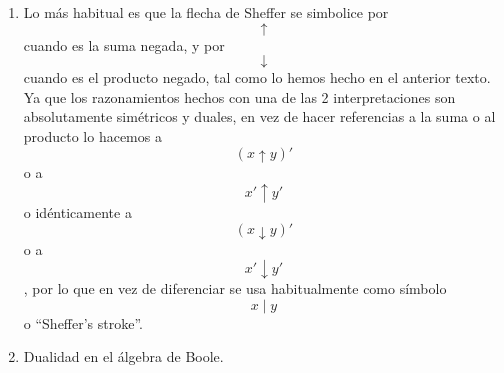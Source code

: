 \documentclass[
]{article}
\providecommand{\tightlist}{%
  \setlength{\itemsep}{0pt}\setlength{\parskip}{0pt}}
\begin{document}
\begin{enumerate}
\begin{enumerate}
\begin{enumerate}
\begin{enumerate}
\begin{enumerate}
          \begin{enumerate}
          \def\labelenumvi{\arabic{enumvi}.}
          \item
            \[\forall x\exists y{{x \cdot y} = 0}\]

            \begin{enumerate}
            \def\labelenumvii{\arabic{enumvii}.}
            \tightlist
            \item
              \[y{: = x}@{x = x}'\]
            \item
              \[{x \cdot x}{' = {({x@x'})}}{' = 1}{' = 0}\]
            \end{enumerate}
          \item
            \[\forall x\exists y{{x + y} = 1}\]

            \begin{enumerate}
            \def\labelenumvii{\arabic{enumvii}.}
            \tightlist
            \item
              \[y{: = x}@{x = x}'\]
            \item
              \[{x + x}{{{' = {x'@x}} = {x@x'}} = 1}\]
            \end{enumerate}
          \end{enumerate}
        \item
          Definición: \[\overline{x} ≝ {x@x}{\equiv}x'\]
        \end{enumerate}
      \end{enumerate}
    \item
      Lo más habitual es que la flecha de Sheffer se simbolice por
      \[\uparrow\] cuando es la suma negada, y por \[\downarrow\]cuando
      es el producto negado, tal como lo hemos hecho en el anterior
      texto. Ya que los razonamientos hechos con una de las 2
      interpretaciones son absolutamente simétricos y duales, en vez de
      hacer referencias a la suma o al producto lo hacemos a
      \[{({x \uparrow y})}'\]o a \[x' \uparrow y'\]o idénticamente a
      \[{({x \downarrow y})}'\]o a \[x' \downarrow y'\], por lo que en
      vez de diferenciar se usa habitualmente como símbolo \[x \mid y\]o
      ``Sheffer's stroke''.
    \item
      Dualidad en el álgebra de Boole.


\end{enumerate}
\end{enumerate}
\end{enumerate}
\end{document}
